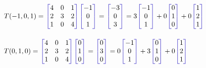 \documentclass[a4paper,10pt]{article}
\newenvironment{bmatrixcolor}[1][red]
  {\colorlet{savethecolor}{.}\colorlet{bracecolor}{#1}%
    \color{bracecolor}\left[\color{savethecolor}\begin{matrix}}
  {\end{matrix}\color{bracecolor}\right]}
\begin{document}
\begin{enumerate}
\begin{enumerate}
{{{$T(-1,0,1)=\begin{bmatrixcolor}[iris]
  4 & 0 & 1    \\
  2 & 3 & 2   \\
  1 & 0 & 4          
\end{bmatrixcolor}\begin{bmatrixcolor}[iris]
  -1  \\
  0    \\
  1          
\end{bmatrixcolor}=\begin{bmatrixcolor}[iris]
  -3  \\
  0   \\
  3          
\end{bmatrixcolor}=3\begin{bmatrixcolor}[iris]
  -1  \\
  0    \\
  1          
\end{bmatrixcolor}+0\begin{bmatrixcolor}[iris]
  0  \\
  1    \\
  0          
\end{bmatrixcolor}+0\begin{bmatrixcolor}[iris]
  1  \\
  2    \\
  1          
\end{bmatrixcolor} $ \\\\


$T(0,1,0)=\begin{bmatrixcolor}[iris]
  4 & 0 & 1    \\
  2 & 3 & 2   \\
  1 & 0 & 4          
\end{bmatrixcolor}\begin{bmatrixcolor}[iris]
  0 \\
  1    \\
  0          
\end{bmatrixcolor}=\begin{bmatrixcolor}[iris]
  0  \\
  3    \\
  0          
\end{bmatrixcolor}=0\begin{bmatrixcolor}[iris]
  -1  \\
  0    \\
  1          
\end{bmatrixcolor}+3\begin{bmatrixcolor}[iris]
  0  \\
  1    \\
  0          
\end{bmatrixcolor}+0\begin{bmatrixcolor}[iris]
  1  \\
  2    \\
  1          
\end{bmatrixcolor} $ \\\\


}}}
\end{enumerate}
\end{enumerate}
\end{document}
